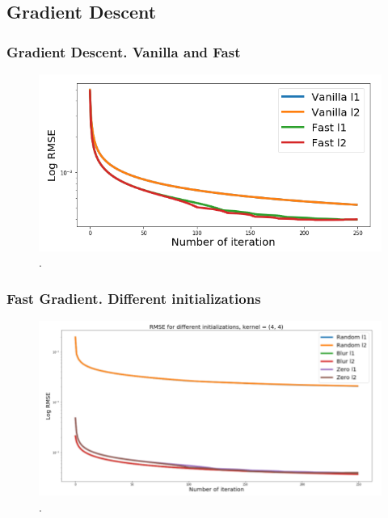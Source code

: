 \documentclass[hyperref={pdfpagelabels=false}]{beamer}
\begin{document}
\subsection{Gradient Descent}
\begin{frame}
\frametitle{Gradient Descent. Vanilla and Fast}

\begin{center}
\begin{figure}[h]
\begin{adjustwidth}{-0.5cm}{-0.5 cm}
\includegraphics[scale=0.67]{van_fast.png}
\end{adjustwidth}
\caption{.}
\end{figure}
\end{center}

\end{frame}
\begin{frame}
\frametitle{Fast Gradient. Different initializations}

\begin{center}
\begin{figure}[h]
\begin{adjustwidth}{-0.2cm}{-0.5 cm}
\includegraphics[scale=0.5]{grad_init.png}
\end{adjustwidth}
\caption{.}
\end{figure}
\end{center}

\end{frame}
\end{document}
